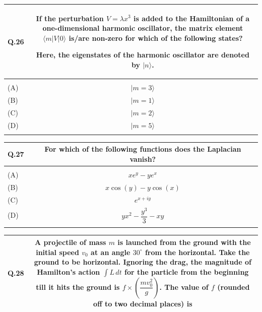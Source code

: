 \documentclass[12pt,a4paper]{article}
\begin{document}
\newpage
\begin{table}[h!]
\begin{tabular}{|L|C|}
\hline
Q.26 &
If the perturbation $V = \lambda x^3$ is added to the Hamiltonian of a one-dimensional
harmonic oscillator, the matrix element $\langle m|V|0\rangle$ is/are non-zero for which
of the following states?

\medskip
Here, the eigenstates of the harmonic oscillator are denoted by $|n\rangle$. \\
\hline
 & \\
\hline
(A) & $|m = 3\rangle$ \\
\hline
(B) & $|m = 1\rangle$ \\
\hline
(C) & $|m = 2\rangle$ \\
\hline
(D) & $|m = 5\rangle$ \\
\hline
 & \\
\hline
\end{tabular}
\end{table}

\vspace{0.4cm}

\begin{table}[h!]
\begin{tabular}{|L|C|}
\hline
Q.27 & For which of the following functions does the Laplacian vanish? \\
\hline
 & \\
\hline
(A) & $x e^{y} - y e^{x}$ \\[8pt]
\hline
(B) & $x\cos(y) - y\cos(x)$ \\[8pt]
\hline
(C) & $e^{x+iy}$ \\[8pt]
\hline
(D) & \rule{0pt}{1.2cm}$yx^{2} - \dfrac{y^{3}}{3} - xy$ \\[8pt]
\hline
 & \\
\hline
\end{tabular}
\end{table}

\newpage
\vspace{0.4cm}

\begin{table}[h!]
\begin{tabular}{|L|C|}
\hline
Q.28 &
A projectile of mass $m$ is launched from the ground with the initial speed $v_0$ at an
angle $30^\circ$ from the horizontal. Take the ground to be horizontal. Ignoring the
drag, the magnitude of Hamilton's action $\int L\,dt$ for the particle from the beginning
till it hits the ground is $f \times \!\left(\dfrac{mv_0^2}{g}\right)$. The value of $f$
(rounded off to two decimal places) is \underline{\hspace{1.5cm}} \\
\hline
\end{tabular}
\end{table}
\end{document}
